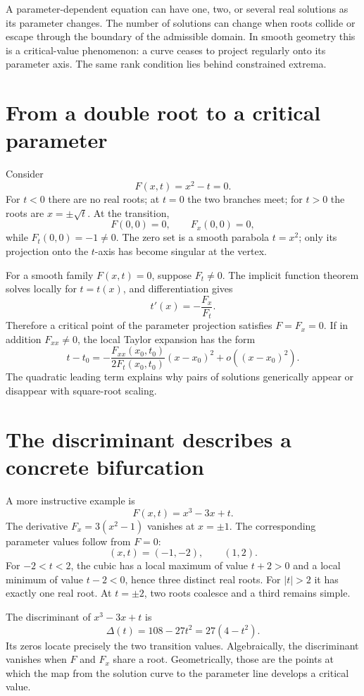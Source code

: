 
A parameter-dependent equation can have one, two, or several real solutions as its parameter changes. The number of solutions can change when roots collide or escape through the boundary of the admissible domain. In smooth geometry this is a critical-value phenomenon: a curve ceases to project regularly onto its parameter axis. The same rank condition lies behind constrained extrema.

\section{From a double root to a critical parameter}

Consider
\[
 F(x,t)=x^2-t=0.
\]
For \(t<0\) there are no real roots; at \(t=0\) the two branches meet; for \(t>0\) the roots are \(x=\pm\sqrt t\). At the transition,
\[
 F(0,0)=0,\qquad F_x(0,0)=0,
\]
while \(F_t(0,0)=-1\ne0\). The zero set is a smooth parabola \(t=x^2\); only its projection onto the \(t\)-axis has become singular at the vertex.

For a smooth family \(F(x,t)=0\), suppose \(F_t\ne0\). The implicit function theorem solves locally for \(t=t(x)\), and differentiation gives
\[
 t'(x)=-\frac{F_x}{F_t}.
\]
Therefore a critical point of the parameter projection satisfies \(F=F_x=0\). If in addition \(F_{xx}\ne0\), the local Taylor expansion has the form
\[
 t-t_0=-\frac{F_{xx}(x_0,t_0)}{2F_t(x_0,t_0)}
        (x-x_0)^2+o((x-x_0)^2).
\]
The quadratic leading term explains why pairs of solutions generically appear or disappear with square-root scaling.

\section{The discriminant describes a concrete bifurcation}

A more instructive example is
\[
 F(x,t)=x^3-3x+t.
\]
The derivative \(F_x=3(x^2-1)\) vanishes at \(x=\pm1\). The corresponding parameter values follow from \(F=0\):
\[
 (x,t)=(-1,-2),\qquad (1,2).
\]
For \(-2<t<2\), the cubic has a local maximum of value \(t+2>0\) and a local minimum of value \(t-2<0\), hence three distinct real roots. For \(|t|>2\) it has exactly one real root. At \(t=\pm2\), two roots coalesce and a third remains simple.

The discriminant of \(x^3-3x+t\) is
\[
 \Delta(t)=108-27t^2=27(4-t^2).
\]
Its zeros locate precisely the two transition values. Algebraically, the discriminant vanishes when \(F\) and \(F_x\) share a root. Geometrically, those are the points at which the map from the solution curve to the parameter line develops a critical value.

